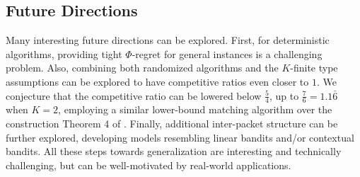 \subsection{Future Directions}
Many interesting future directions can be explored. First, for deterministic algorithms, providing tight $\Phi$-regret for general instances is a challenging problem. Also, combining both randomized algorithms and the $K$-finite type assumptions can be explored to have competitive ratios even closer to $1$. We conjecture that the competitive ratio can be lowered below $\frac{5}{4}$, up to $\frac{7}{6} =  1.1\bar{6}$ when $K=2$, employing a similar lower-bound matching algorithm over the construction Theorem 4 of \cite{chin2003online}. Finally, additional inter-packet structure can be further explored, developing models resembling linear bandits and/or contextual bandits. All these steps towards generalization are interesting and technically challenging, but can be well-motivated by real-world applications.









